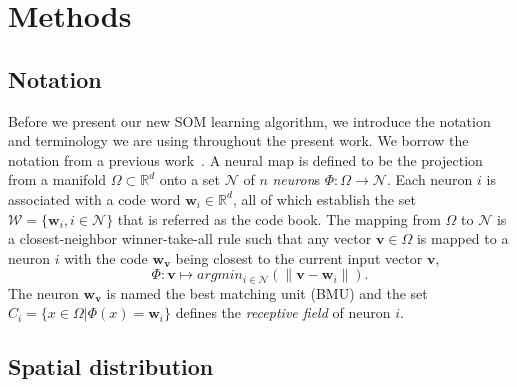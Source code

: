 \section{Methods}

\subsection{Notation}
Before we present our new SOM learning algorithm, we introduce the notation 
and terminology we are using throughout the present work. We borrow the
notation from a previous work~\citep{rougier:2011}. 
A neural map is defined to be the projection from a manifold
$\Omega \subset \mathbb{R}^d$ onto a set $\mathcal{N}$ of $n$ {\em neuron}s
$\Phi : \Omega \rightarrow \mathcal{N}$.
Each neuron $i$ is associated with a code word $\mathbf{w}_i \in
\mathbb{R}^d$, all of which establish the set 
$\mathcal{W} = \{\mathbf{w}_i, i \in \mathcal{N}\}$ that is referred as the code book. The mapping from $\Omega$ to
$\mathcal{N}$ is a closest-neighbor winner-take-all rule such that any vector
$\mathbf{v} \in \Omega$ is mapped to a neuron $i$ with the code
$\mathbf{w}_\mathbf{v}$ being closest to the current input vector
$\mathbf{v}$,
\begin{equation}
\Phi : \mathbf{v} \mapsto argmin_{i \in \mathcal{N}} (\lVert \mathbf{v} -
\mathbf{w}_i \rVert).
\label{eq:psi}
\end{equation}
The neuron $\mathbf{w}_\mathbf{v}$ is named the best matching unit (BMU) and
the set $C_i = \{x \in \Omega | \Phi(x) = \mathbf{w}_i \}$ defines the {\em
  receptive field} of neuron $i$.


\subsection{Spatial distribution} %
\label{sec:spatial_dist}

